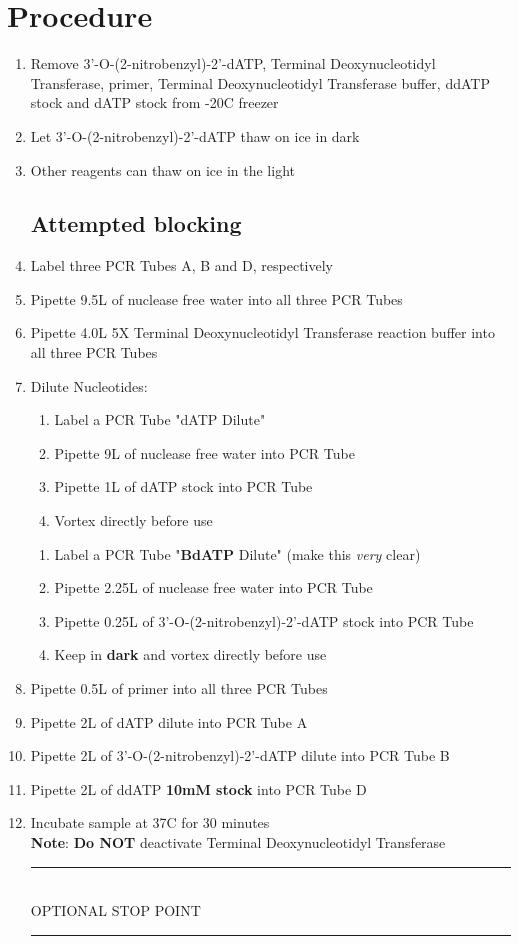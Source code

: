 \documentclass[letterpaper]{article}
\newcommand{\tdt}{Terminal Deoxynucleotidyl Transferase}
\newcommand{\C}{\degree{}C}
\newcommand{\uL}{\micro{}L}
\newcommand{\BdATP}{3'-O-(2-nitrobenzyl)-2'-dATP}
\newcommand{\stopPoint}{\begin{center}
\rule{0.5\textwidth}{.4pt}\\
\vspace{1mm} 
OPTIONAL STOP POINT\\
\rule{0.5\textwidth}{.4pt}
\end{center}}
\begin{document}
\section{Procedure}%
\begin{enumerate} 
\subsection{Sample Preparation}
\item{Remove \BdATP{}, \tdt{}, primer, \tdt{}  buffer, ddATP stock and dATP stock from -20\C{} freezer}
\item{Let \BdATP{} thaw on ice in dark}
\item{Other reagents can thaw on ice in the light}
\subsection{Attempted blocking}
\item{Label three PCR Tubes A, B and D, respectively}
\item{Pipette 9.5\uL{} of nuclease free water into all three PCR Tubes}
\item{Pipette 4.0\uL{} 5X \tdt{} reaction buffer into all three PCR Tubes}
\item{Dilute Nucleotides:
\begin{enumerate}
\item{Label a PCR Tube "dATP Dilute"}
\item{Pipette 9\uL{} of nuclease free water into PCR Tube}
\item{Pipette 1\uL{} of dATP stock into PCR Tube}
\item{Vortex directly before use}
\end{enumerate}
\begin{enumerate}
\item{Label a PCR Tube "\textbf{BdATP} Dilute" (make this \textit{very} clear)}
\item{Pipette 2.25\uL{} of nuclease free water into PCR Tube}
\item{Pipette 0.25\uL{} of \BdATP{} stock into PCR Tube}
\item{Keep in \textbf{dark} and vortex directly before use}
\end{enumerate}
}
\item{Pipette 0.5\uL{} of primer into all three PCR Tubes}
\item{Pipette 2\uL{} of dATP dilute into PCR Tube A}
\item{Pipette 2\uL{} of \BdATP{} dilute into PCR Tube B}
\item{Pipette 2\uL{} of ddATP \textbf{10mM stock} into PCR Tube D}
\item{Incubate sample at 37\C{} for 30 minutes}\\
\textbf{Note}: \textbf{Do NOT} deactivate \tdt{} 
\stopPoint{} 

\end{enumerate}
\end{document}
